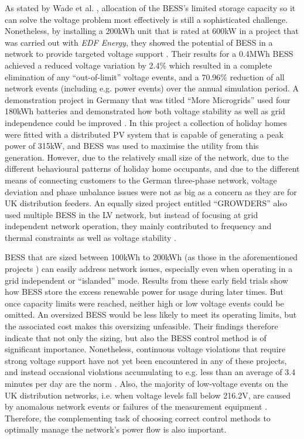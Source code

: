 As stated by Wade et al. \cite{Wade2009}, allocation of the BESS's limited storage capacity so it can solve the voltage problem most effectively is still a sophisticated challenge.
Nonetheless, by installing a 200kWh unit that is rated at 600kW in a project that was carried out with \textit{EDF Energy}, they showed the potential of BESS in a network to provide targeted voltage support \cite{Wade2010}.
Their results for a 0.4MWh BESS achieved a reduced voltage variation by 2.4\% which resulted in a complete elimination of any ``out-of-limit'' voltage events, and a 70.96\% reduction of all network events (including e.g. power events) over the annual simulation period.
A demonstration project in Germany that was titled ``More Microgrids'' used four 180kWh batteries and demonstrated how both voltage stability as well as grid independence could be improved \cite{Overbeeke2010}.
In this project a collection of holiday homes were fitted with a distributed PV system that is capable of generating a peak power of 315kW, and BESS was used to maximise the utility from this generation.
However, due to the relatively small size of the network, due to the different behavioural patterns of holiday home occupants, and due to the different means of connecting customers to the German three-phase network, voltage deviation and phase unbalance issues were not as big as a concern as they are for UK distribution feeders.
An equally sized project entitled ``GROWDERS'' also used multiple BESS in the LV network, but instead of focusing at grid independent network operation, they mainly contributed to frequency and thermal constraints as well as voltage stability \cite{GROWDERS2011}.

BESS that are sized between 100kWh to 200kWh (as those in the aforementioned projects \cite{Wade2010, Wade2009, Overbeeke2010, GROWDERS2011}) can easily address network issues, especially even when operating in a grid independent or ``islanded'' mode.
Results from these early field trials show how BESS store the excess renewable power for usage during later times.
But once capacity limits were reached, neither high or low voltage events could be omitted.
An oversized BESS would be less likely to meet its operating limits, but the associated cost makes this oversizing unfeasible.
Their findings therefore indicate that not only the sizing, but also the BESS control method is of significant importance.
Nonetheless, continuous voltage violations that require strong voltage support have not yet been encountered in any of these projects, and instead occasional violations accumulating to e.g. less than an average of 3.4 minutes per day are the norm \cite{Sugihara2013}.
Also, the majority of low-voltage events on the UK distribution networks, i.e. when voltage levels fall below 216.2V, are caused by anomalous network events or failures of the measurement equipment \cite{UKPowerNetworks2014a}.
Therefore, the complementing task of choosing correct control methods to optimally manage the network's power flow is also important.


